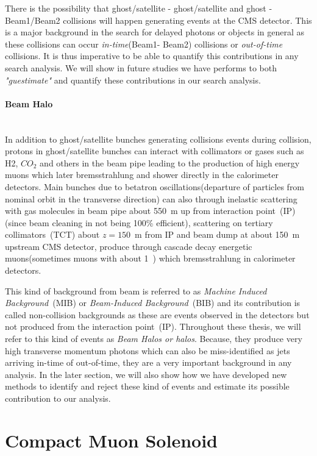 There is the possibility that ghost/satellite - ghost/satellite and ghost - Beam1/Beam2 collisions will happen generating events at the CMS detector. This is a major background in the search for delayed photons or objects in general as these collisions can occur \textit{in-time}(Beam1- Beam2) collisions or \textit{out-of-time} collisions. It is thus imperative to be able to quantify this contributions in any search analysis. We will show in future studies we have performs to both \textit{"guestimate"} and quantify these contributions in our search analysis.
\paragraph*{Beam Halo}\mbox{}\\
In addition to ghost/satellite bunches generating collisions events during collision, protons in ghost/satellite bunches can interact with collimators or gases such as H2, $CO_{2}$ and others in the beam pipe leading to the production of high energy muons which later bremsstrahlung and shower directly in the calorimeter detectors. 
Main bunches due to betatron oscillations(departure of particles from nominal orbit in the transverse direction) can also through inelastic scattering with gas molecules in beam pipe about 550~m up from interaction  point~(IP)(since beam cleaning in not being 100\% efficient), scattering on tertiary collimators~(TCT) about $z = 150$~m from IP and beam dump at about 150~m upstream CMS detector, produce through cascade decay energetic muons(sometimes muons with about 1~\TeV) which bremsstrahlung in calorimeter detectors. 

This kind of background from beam is referred to as \textit{Machine Induced Background}~(MIB) or \textit{Beam-Induced Background}~(BIB) and its contribution is called non-collision backgrounds as these are events observed in the detectors but not produced from the interaction point~(IP). Throughout these thesis, we will refer to this kind of events as \textit{Beam Halos or halos}. Because, they produce very high transverse momentum photons which can also be miss-identified as jets arriving in-time of out-of-time, they are a very important background in any analysis. In the later section, we will also show how we have developed new methods to identify and reject these kind of events and estimate its possible contribution to our analysis.


\section{Compact Muon Solenoid}
